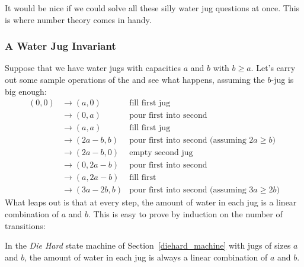 It would be nice if we could solve all these silly water jug questions
at once.  \iffalse In particular, how can one form $g$ gallons using
jugs with capacities $a$ and~$b$?\fi This is where number theory comes
in handy.

\subsubsection{A Water Jug Invariant}\label{jug_invar_subsubsec}

Suppose that we have water jugs with capacities $a$ and $b$ with $b
\geq a$.  Let's carry out some sample operations of the 
and see what happens, assuming the $b$-jug is big enough:
\begin{align*}
(0,0) & \rightarrow (a,0) & \text{fill first jug} \\
& \rightarrow (0,a) & \text{pour first
    into second} \\
& \rightarrow (a, a) & \text{fill first jug} \\
& \rightarrow (2a-b, b)
  & \text{pour first into second (assuming $2a \geq b$)} \\
& \rightarrow (2a-b, 0) &
  \text{empty second jug} \\
& \rightarrow (0, 2a-b) & \text{pour first into second} \\
&
  \rightarrow (a, 2a-b) & \text{fill first} \\
& \rightarrow (3a-2b, b) & \text{pour first
    into second (assuming $3a \geq 2b$)}
\end{align*}
What leaps out is that at every step, the amount of water in each jug
is a linear combination of $a$ and $b$.  This is easy to prove by
induction on the number of transitions:
\begin{lemma}\label{lem:waterjugs}
In the \emph{Die Hard} state machine of
Section~\ref{diehard_machine} with jugs of sizes $a$ and $b$, the
amount of water in each jug is always a linear combination of $a$ and
$b$.
\end{lemma}

